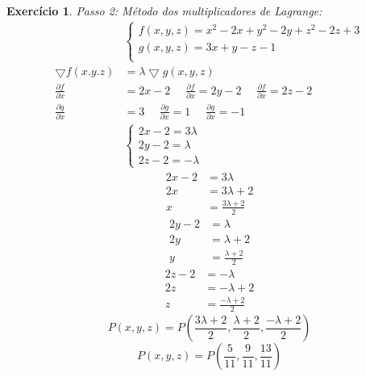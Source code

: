 \documentclass{article}
\newtheorem{ex}{Exercício}
\begin{document}
\begin{ex}
\item Passo 2: Método dos multiplicadores de Lagrange:
\begin{align*}
    &\begin{cases}
    f(x,y,z)=x^2-2x+y^2-2y+z^2-2z+3\\
    g(x,y,z)=3x+y-z-1\\ 
    \end{cases}\\
    \bigtriangledown f(x.y.z)&=\lambda \bigtriangledown g(x,y,z)\\
    \frac{\partial f}{\partial x}&=2x-2 \text{ }\text{ }\frac{\partial f}{\partial x}=2y-2\text{ }\text{ }\frac{\partial f}{\partial x}=2z-2\\
    \frac{\partial g}{\partial x}&=3\text{ }\text{ }\frac{\partial g}{\partial x}=1\text{ }\text{ }\frac{\partial g}{\partial x}=-1\\
    &\begin{cases}
    2x-2=3\lambda\\
    2y-2=\lambda\\
    2z-2=-\lambda
    \end{cases}
\end{align*}
\begin{align*}
    2x-2&=3\lambda\\
    2x&=3\lambda+2\\
    x&=\frac{3\lambda+2}{2}   
\end{align*}
\begin{align*}
    2y-2&=\lambda\\
    2y&=\lambda+2\\
    y&=\frac{\lambda+2}{2}   
\end{align*}
\begin{align*}
    2z-2&=-\lambda\\
    2z&=-\lambda+2\\
    z&=\frac{-\lambda+2}{2}   
\end{align*}
\[P(x,y,z)=P\left(\frac{3\lambda+2}{2},\frac{\lambda+2}{2},\frac{-\lambda+2}{2}\right)\]
\[P(x,y,z)=P\left(\frac{5}{11},\frac{9}{11},\frac{13}{11}\right)\]
\end{ex}
\end{document}
